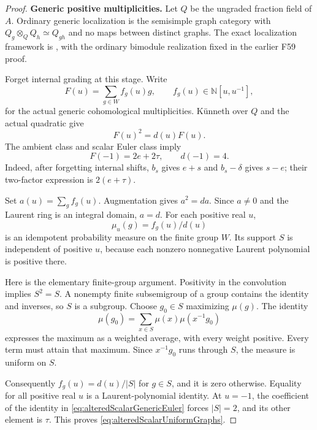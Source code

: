 \documentclass[11pt,a4paper]{article}
\renewcommand{\S}{\ensuremath{\mathsection}}
\newcommand{\fid}[1]{\textsf{#1}}\newcommand{\gate}[1]{\textsf{#1}}
\theoremstyle{named}\newtheorem{finding}{Finding}[section]
\theoremstyle{definition}\newtheorem{definition}[finding]{Definition}
\theoremstyle{remark}\newtheorem{remark}[finding]{Remark}
\begin{document}
\begin{proof}
\par\smallskip\noindent\textbf{Generic positive multiplicities.}\quad
Let \(Q\) be the ungraded fraction field of \(A\).
Ordinary generic localization is the semisimple graph
category with \(Q_g\otimes_Q Q_h\simeq Q_{gh}\) and
no maps between distinct graphs. The exact localization
framework is \cite[\S1.1, equations (1.1)--(1.2);
\S1.2, Theorem~1.6 and Remark~1.7]{EWLocalized}, with
the ordinary bimodule realization fixed in the earlier
\fid{F59} proof.

Forget internal grading at this stage. Write
\[
 F(u)=\sum_{g\in W}f_g(u)g,
 \qquad f_g(u)\in\mathbb N[u,u^{-1}],
\]
for the actual generic cohomological multiplicities.
K\"unneth over \(Q\) and the actual quadratic give
\begin{equation}\label{eq:alteredScalarGroupQuadratic}
                         F(u)^2=d(u)F(u).
\end{equation}
The ambient class and scalar Euler class imply
\begin{equation}\label{eq:alteredScalarGenericEuler}
                    F(-1)=2e+2\tau,\qquad d(-1)=4.
\end{equation}
Indeed, after forgetting internal shifts, \(b_s\) gives
\(e+s\) and \(b_s-\delta\) gives \(s-e\); their
two-factor expression is \(2(e+\tau)\).

Set \(a(u)=\sum_g f_g(u)\). Augmentation gives
\(a^2=da\). Since \(a\ne0\) and the Laurent ring is
an integral domain, \(a=d\). For each positive real
\(u\),
\[
                       \mu_u(g)=f_g(u)/d(u)
\]
is an idempotent probability measure on the finite group
\(W\). Its support \(S\) is independent of positive
\(u\), because each nonzero nonnegative Laurent polynomial
is positive there.

Here is the elementary finite-group argument. Positivity
in the convolution implies \(S^2=S\). A nonempty finite
subsemigroup of a group contains the identity and inverses,
so \(S\) is a subgroup. Choose \(g_0\in S\) maximizing
\(\mu(g)\). The identity
\[
 \mu(g_0)=\sum_{x\in S}\mu(x)\mu(x^{-1}g_0)
\]
expresses the maximum as a weighted average, with every
weight positive. Every term must attain that maximum.
Since \(x^{-1}g_0\) runs through \(S\), the measure is
uniform on \(S\).

Consequently \(f_g(u)=d(u)/|S|\) for \(g\in S\),
and it is zero otherwise. Equality for all positive real
\(u\) is a Laurent-polynomial identity. At \(u=-1\),
the coefficient of the identity in
\eqref{eq:alteredScalarGenericEuler} forces \(|S|=2\),
and its other element is \(\tau\). This proves
\eqref{eq:alteredScalarUniformGraphs}.


\end{proof}
\end{document}
